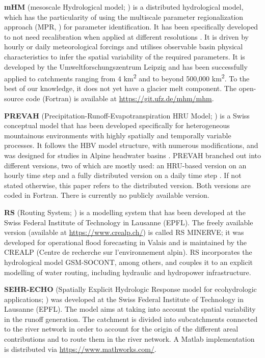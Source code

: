 \documentclass[10pt,a4paper]{article}
\begin{document}
\textbf{mHM} (mesoscale Hydrological model; \citealt{Samaniego2010a, Kumar2013, Thober2019}) is a distributed hydrological model, which has the particularity of using the multiscale parameter regionalization approach (MPR, \citealp{Samaniego2010a}) for parameter identification. It has been specifically developed to not need recalibration when applied at different resolutions \citep{Kauffeldt2016}. It is driven by hourly or daily meteorological forcings and utilises observable basin physical characteristics to infer the spatial variability of the required parameters. It is developed by the Umweltforschungszentrum Leipzig and has been successfully applied to catchments ranging from 4 km\textsuperscript{2} and to beyond 500,000 km\textsuperscript{2}. To the best of our knowledge, it does not yet have a glacier melt component. The open-source code (Fortran) is available at \url{https://git.ufz.de/mhm/mhm}.

\textbf{PREVAH} (Precipitation-Runoff-Evapotranspiration HRU Model; \citealt{Gurtz1999, Viviroli2009a}) is a Swiss conceptual model that has been developed specifically for heterogeneous mountainous environments with highly spatially and temporally variable processes. It follows the HBV model structure, with numerous modifications, and was designed for studies in Alpine headwater basins \citep{Orth2015}. PREVAH branched out into different versions, two of which are mostly used: an HRU-based version on an hourly time step \citep{Viviroli2009a} and a fully distributed version on a daily time step \citep{Zappa2012, Speich2015}. If not stated otherwise, this paper refers to the distributed version. Both versions are coded in Fortran. There is currently no publicly available version.

\textbf{RS} (Routing System; \citealp{Dubois2000, GarciaHernandez2020, Foehn2020}) is a modelling system that has been developed at the Swiss Federal Institute of Technology in Lausanne (EPFL). The freely available version (available at \url{https://www.crealp.ch/}) is called RS MINERVE; it was developed for operational flood forecasting in Valais \citep{GarciaHernandez2009b, Hamdi2005} and is maintained by the CREALP (Centre de recherche sur l'environnement alpin). RS incorporates the hydrological model GSM-SOCONT, among others, and couples it to an explicit modelling of water routing, including hydraulic and hydropower infrastructure.

\textbf{SEHR-ECHO} (Spatially Explicit Hydrologic Response model for ecohydrologic applications; \citealp{Schaefli2014}) was developed at the Swiss Federal Institute of Technology in Lausanne (EPFL). The model aims at taking into account the spatial variability in the runoff generation. The catchment is divided into subcatchments connected to the river network in order to account for the origin of the different areal contributions and to route them in the river network. A Matlab implementation is distributed via \url{https://www.mathworks.com/}.
\end{document}
